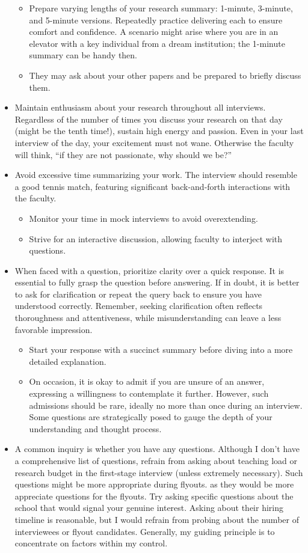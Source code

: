 \documentclass[12pt]{article}
\begin{document}
\begin{itemize}
\begin{itemize}
\item Prepare varying lengths of your research summary: 1-minute, 3-minute, and 5-minute versions. Repeatedly practice delivering each to ensure comfort and confidence. A scenario might arise where you are in an elevator with a key individual from a dream institution; the 1-minute summary can be handy then.
\item They may ask about your other papers and be prepared to briefly discuss them.
\end{itemize}
\item Maintain enthusiasm about your research throughout all interviews. Regardless of the number of times you discuss your research on that day (might be the tenth time!), sustain high energy and passion. Even in your last interview of the day, your excitement must not wane. Otherwise the faculty will think, ``if they are not passionate, why should we be?''
\item Avoid excessive time summarizing your work. The interview should resemble a good tennis match, featuring significant back-and-forth interactions with the faculty.
\begin{itemize}
\item Monitor your time in mock interviews to avoid overextending.
\item Strive for an interactive discussion, allowing faculty to interject with questions.
\end{itemize}
\item When faced with a question, prioritize clarity over a quick response. It is essential to fully grasp the question before answering. If in doubt, it is better to ask for clarification or repeat the query back to ensure you have understood correctly. Remember, seeking clarification often reflects thoroughness and attentiveness, while misunderstanding can leave a less favorable impression.
\begin{itemize}
\item Start your response with a succinct summary before diving into a more detailed explanation.
\item On occasion, it is okay to admit if you are unsure of an answer, expressing a willingness to contemplate it further. However, such admissions should be rare, ideally no more than once during an interview. Some questions are strategically posed to gauge the depth of your understanding and thought process.
\end{itemize}
\item A common inquiry is whether you have any questions. Although I don’t have a comprehensive list of questions, refrain from asking about teaching load or research budget in the first-stage interview (unless extremely necessary). Such questions might be more appropriate during flyouts. as they would be more appreciate questions for the flyouts. Try asking specific questions about the school that would signal your genuine interest. Asking about their hiring timeline is reasonable, but I would refrain from probing about the number of interviewees or flyout candidates. Generally, my guiding principle is to concentrate on factors within my control.

\end{itemize}
\end{document}
